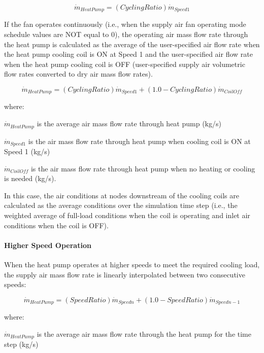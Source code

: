 \begin{equation}
{\dot m_{HeatPump}} = (CyclingRatio){\dot m_{Speed1}}
\end{equation}

If the fan operates continuously (i.e., when the supply air fan operating mode schedule values are NOT equal to 0), the operating air mass flow rate through the heat pump is calculated as the average of the user-specified air flow rate when the heat pump cooling coil is ON at Speed 1 and the user-specified air flow rate when the heat pump cooling coil is OFF (user-specified supply air volumetric flow rates converted to dry air mass flow rates).

\begin{equation}
{\dot m_{HeatPump}} = (CyclingRatio){\dot m_{Speed1}} + (1.0 - CyclingRatio){\dot m_{CoilOff}}
\end{equation}

where:

\({\dot m_{HeatPump}}\) is the average air mass flow rate through heat pump (kg/s)

\({{{\dot m}_{Speed1}}}\) is the air mass flow rate through heat pump when cooling coil is ON at Speed 1 (kg/s)

\({{{\dot m}_{CoilOff}}}\) is the air mass flow rate through heat pump when no heating or cooling is needed (kg/s).

In this case, the air conditions at nodes downstream of the cooling coils are calculated as the average conditions over the simulation time step (i.e., the weighted average of full-load conditions when the coil is operating and inlet air conditions when the coil is OFF).

\paragraph{Higher Speed Operation}\label{higher-speed-operation-1}

When the heat pump operates at higher speeds to meet the required cooling load, the supply air mass flow rate is linearly interpolated between two consecutive speeds:

\begin{equation}
{\dot m_{HeatPump}} = (SpeedRatio){\dot m_{Speedn}} + (1.0 - SpeedRatio){\dot m_{Speedn-1}}
\end{equation}

where:

\({\dot m_{HeatPump}}\) is the average air mass flow rate through the heat pump for the time step (kg/s)

